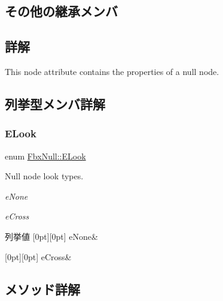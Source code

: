 \subsection*{その他の継承メンバ}


\subsection{詳解}
This node attribute contains the properties of a null node. 

\subsection{列挙型メンバ詳解}
\mbox{\label{class_fbx_null_aa68cd0be1fca86a79ab603ee99505d78}} 
\subsubsection{\texorpdfstring{E\+Look}{ELook}}
{\footnotesize\ttfamily enum \hyperlink{class_fbx_null_aa68cd0be1fca86a79ab603ee99505d78}{Fbx\+Null\+::\+E\+Look}}

Null node look types.
\begin{DoxyItemize}
\item {\itshape e\+None} 
\item {\itshape e\+Cross} 
\end{DoxyItemize}\begin{DoxyEnumFields}{列挙値}
[0pt][0pt]{}\mbox{\label{class_fbx_null_aa68cd0be1fca86a79ab603ee99505d78ad2af5d3ef7bcedf7eea5eea2aa0c0330}} 
e\+None&\\
\hline

[0pt][0pt]{}\mbox{\label{class_fbx_null_aa68cd0be1fca86a79ab603ee99505d78aa5ca9ae8a4d16c590308517c74e8ec78}} 
e\+Cross&\\
\hline

\end{DoxyEnumFields}


\subsection{メソッド詳解}
\mbox{\label{class_fbx_null_afb0901136678ef0bbea8cbc9227e9ffd}} 
